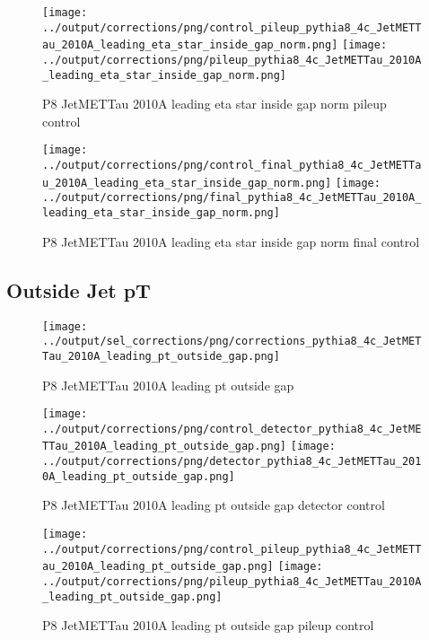 \documentclass[11pt]{book}
\begin{document}
\begin{figure}[ht]
\centering
\texttt{[image: ../output/corrections/png/control\_pileup\_pythia8\_4c\_JetMETTau\_2010A\_leading\_eta\_star\_inside\_gap\_norm.png]}
\texttt{[image: ../output/corrections/png/pileup\_pythia8\_4c\_JetMETTau\_2010A\_leading\_eta\_star\_inside\_gap\_norm.png]}
\caption{P8 JetMETTau 2010A leading eta star inside gap norm pileup control}
\label{fig:p8_JetMETTau_2010A_leading_eta_star_inside_gap_norm_pileup_control}
\end{figure}


\begin{figure}[ht]
\centering
\texttt{[image: ../output/corrections/png/control\_final\_pythia8\_4c\_JetMETTau\_2010A\_leading\_eta\_star\_inside\_gap\_norm.png]}
\texttt{[image: ../output/corrections/png/final\_pythia8\_4c\_JetMETTau\_2010A\_leading\_eta\_star\_inside\_gap\_norm.png]}
\caption{P8 JetMETTau 2010A leading eta star inside gap norm final control}
\label{fig:p8_JetMETTau_2010A_leading_eta_star_inside_gap_norm_final_control}
\end{figure}

\clearpage
\subsection{Outside Jet pT}
\begin{figure}[ht]
\centering
\texttt{[image: ../output/sel\_corrections/png/corrections\_pythia8\_4c\_JetMETTau\_2010A\_leading\_pt\_outside\_gap.png]}
\caption{P8 JetMETTau 2010A leading pt outside gap}
\label{fig:p8_JetMETTau_2010A_leading_pt_outside_gap}
\end{figure}

\begin{figure}[ht]
\centering
\texttt{[image: ../output/corrections/png/control\_detector\_pythia8\_4c\_JetMETTau\_2010A\_leading\_pt\_outside\_gap.png]}
\texttt{[image: ../output/corrections/png/detector\_pythia8\_4c\_JetMETTau\_2010A\_leading\_pt\_outside\_gap.png]}
\caption{P8 JetMETTau 2010A leading pt outside gap detector control}
\label{fig:p8_JetMETTau_2010A_leading_pt_outside_gap_detector_control}
\end{figure}

\begin{figure}[ht]
\centering
\texttt{[image: ../output/corrections/png/control\_pileup\_pythia8\_4c\_JetMETTau\_2010A\_leading\_pt\_outside\_gap.png]}
\texttt{[image: ../output/corrections/png/pileup\_pythia8\_4c\_JetMETTau\_2010A\_leading\_pt\_outside\_gap.png]}
\caption{P8 JetMETTau 2010A leading pt outside gap pileup control}
\label{fig:p8_JetMETTau_2010A_leading_pt_outside_gap_pileup_control}
\end{figure}
\end{document}
